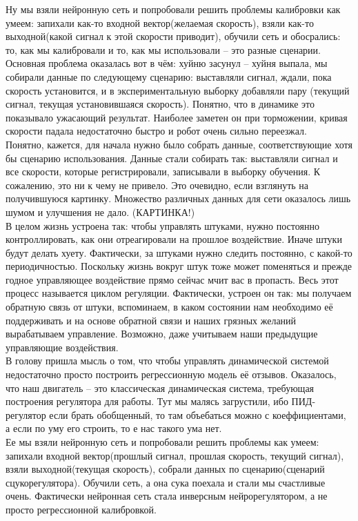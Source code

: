 \documentclass[14pt]{extreport}
\begin{document}
        Ну мы взяли нейронную сеть и попробовали решить проблемы калибровки как умеем: запихали как-то входной вектор(желаемая скорость), взяли как-то выходной(какой сигнал к этой скорости приводит), обучили сеть и обосрались: то, как мы калибровали и то, как мы использовали -- это разные сценарии.
        Основная проблема оказалась вот в чём: хуйню засунул -- хуйня выпала, мы собирали данные по следующему сценарию: выставляли сигнал, ждали, пока скорость установится, и в экспериментальную выборку добавляли пару (текущий сигнал, текущая установившаяся скорость). Понятно, что в динамике это показывало ужасающий результат. Наиболее заметен он при торможении, кривая скорости падала недостаточно быстро и робот очень сильно переезжал.\\
        Понятно, кажется, для начала нужно было собрать данные, соответствующие хотя бы сценарию использования. Данные стали собирать так: выставляли сигнал и все скорости, которые регистрировали, записывали в выборку обучения. К сожалению, это ни к чему не привело. Это очевидно, если взглянуть на получившуюся картинку. Множество различных данных для сети оказалось лишь шумом и улучшения не дало. (КАРТИНКА!)\\
        В целом жизнь устроена так: чтобы управлять штуками, нужно постоянно контроллировать, как они отреагировали на прошлое воздействие. Иначе штуки будут делать хуету. Фактически, за штуками нужно следить постоянно, с какой-то периодичностью. Поскольку жизнь вокруг штук тоже может поменяться и прежде годное управляющее воздействие прямо сейчас мчит вас в пропасть. Весь этот процесс называется циклом регуляции. Фактически, устроен он так: мы получаем обратную связь от штуки, вспоминаем, в каком состоянии нам необходимо её поддерживать и на основе обратной связи и наших грязных желаний вырабатываем управление. Возможно, даже учитываем наши предыдущие управляющие воздействия.\\
        В голову пришла мысль о том, что чтобы управлять динамической системой недостаточно просто построить регрессионную модель её отзывов. Оказалось, что наш двигатель -- это классическая динамическая система, требующая построения регулятора для работы. Тут мы малясь загрустили, ибо ПИД-регулятор если брать обобщенный, то там объебаться можно с коеффициентами, а если по уму его строить, то е нас такого ума нет.\\
        Ее мы взяли нейронную сеть и попробовали решить проблемы как умеем: запихали входной вектор(прошлый сигнал, прошлая скорость, текущий сигнал), взяли выходной(текущая скорость), собрали данных по сценарию(сценарий сцукорегулятора). Обучили сеть, а она сука поехала и стали мы счастливые очень. Фактически нейронная сеть стала инверсным нейрорегулятором, а не просто регрессионной калибровкой.
\end{document}
